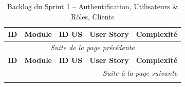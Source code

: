 
\begin{longtable}{|c|c|c|p{7.2cm}|c|}
\caption{Backlog du Sprint 1 -- Authentification, Utilisateurs \& Rôles, Clients} \label{tab:backlog-sprint-1} \\
\hline
\textbf{ID} & \textbf{Module} & \textbf{ID US} & \textbf{User Story} & \textbf{Complexité} \\
\hline
\endfirsthead

\multicolumn{5}{c}{\textit{Suite de la page précédente}} \\
\hline
\textbf{ID} & \textbf{Module} & \textbf{ID US} & \textbf{User Story} & \textbf{Complexité} \\
\hline
\endhead

\hline \multicolumn{5}{r}{\textit{Suite à la page suivante}} \\
\endfoot

\hline
\endlastfoot


\end{longtable}
